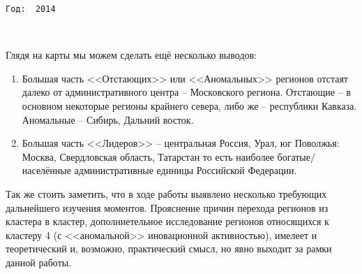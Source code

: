 \documentclass[11pt]{article}
\begin{document}
    \begin{Verbatim}[commandchars=\\\{\}]
Год:  2014

    \end{Verbatim}

    \begin{center}
    \end{center}
    { \hspace*{\fill} \\}
    
    Глядя на карты мы можем сделать ещё несколько выводов:

\begin{enumerate}
\item Большая часть <<Отстающих>> или <<Аномальных>> регионов отстаят далеко от административного центра -- Московского региона. Отстающие -- в основном некоторые регионы крайнего севера, либо же -- республики Кавказа. Аномальные -- Сибирь, Дальний восток.
\item Большая часть <<Лидеров>> -- центральная Россия, Урал, юг Поволжья: Москва, Свердловская область, Татарстан то есть наиболее богатые/населённые  административные единицы Российской Федерации.
\end{enumerate}

Так же стоить заметить, что в ходе работы выявлено несколько требующих
дальнейшего изучения моментов. Прояснение причин перехода регионов из
кластера в кластер, дополниетельное исследование регионов относящихся к
кластеру 4 (с <<аномальной>> иновационной активностью), имелеет и
теоретический и, возможно, практический смысл, но явно выходит за рамки
данной работы.

\newpage

\end{document}
